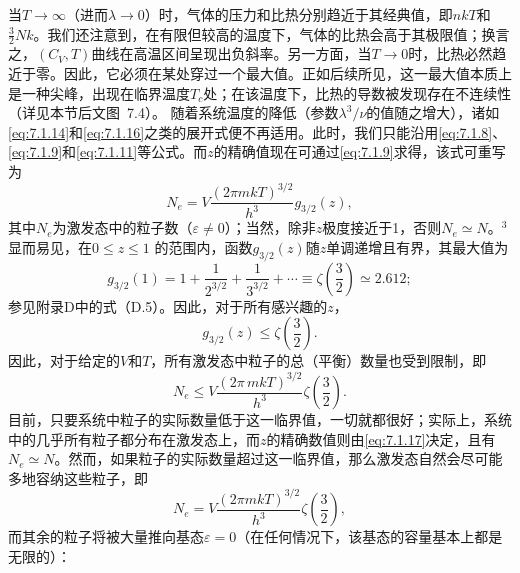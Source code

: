 当\(T \to \infty\)（进而\(\lambda \to 0\)）时，气体的压力和比热分别趋近于其经典值，即\(nkT\)和\(\frac{3}{2}Nk\)。我们还注意到，在有限但较高的温度下，气体的比热会高于其极限值；换言之，\((C_V, T)\)曲线在高温区间呈现出负斜率。另一方面，当\(T \to 0\)时，比热必然趋近于零。因此，它必须在某处穿过一个最大值。正如后续所见，这一最大值本质上是一种尖峰，出现在临界温度\(T_c\)处；在该温度下，比热的导数被发现存在不连续性（详见本节后文图~7.4）。
随着系统温度的降低（参数\(\lambda^{3}/\nu\)的值随之增大），诸如\autoref{eq:7.1.14}和\autoref{eq:7.1.16}之类的展开式便不再适用。此时，我们只能沿用\autoref{eq:7.1.8}、\autoref{eq:7.1.9}和\autoref{eq:7.1.11}等公式。而\(z\)的精确值现在可通过\autoref{eq:7.1.9}求得，该式可重写为
\begin{equation}\tag{7.1.17}\label{eq:7.1.17}
N _ { e } = V \frac { ( 2 \pi m k T ) ^{3 / 2} } { h ^{3} } g _ { 3 / 2 } ( z ) ,
\end{equation}
其中\(N_{e}\)为激发态中的粒子数（\(\varepsilon \neq 0\)）；当然，除非\(z\)极度接近于1，否则\(N_{e} \simeq N\)。\(^{3}\) 显而易见，在\(0 \leq z \leq 1\) 的范围内，函数\(g_{3/2}(z)\)随\(z\)单调递增且有界，其最大值为
\begin{equation}\tag{7.1.18}\label{eq:7.1.18}
g _ { 3 / 2 } ( 1 ) = 1 + \frac { 1 } { 2 ^{3 / 2} } + \frac { 1 } { 3 ^{3 / 2} } + \cdots \equiv \zeta \left( \frac { 3 } { 2 } \right) \simeq 2 . 61 2 ;
\end{equation}
参见附录D中的式（D.5）。因此，对于所有感兴趣的\(z\)，
\begin{equation}\tag{7.1.19}\label{eq:7.1.19}
g _ { 3 / 2 } ( z ) \leq \zeta \left( \frac { 3 } { 2 } \right) .
\end{equation}
因此，对于给定的\(V\)和\(T\)，所有激发态中粒子的总（平衡）数量也受到限制，即
\begin{equation}\tag{7.1.20}\label{eq:7.1.20}
N _ { e } \leq V \frac { ( 2 \pi \, m k T ) ^{3 / 2} } { h ^{3} } \zeta \left( \frac { 3 } { 2 } \right) .
\end{equation}
目前，只要系统中粒子的实际数量低于这一临界值，一切就都很好；实际上，系统中的几乎所有粒子都分布在激发态上，而\(z\)的精确数值则由\autoref{eq:7.1.17}决定，且有\(N_{e} \simeq N\)。然而，如果粒子的实际数量超过这一临界值，那么激发态自然会尽可能多地容纳这些粒子，即
\begin{equation}\tag{7.1.21}\label{eq:7.1.21}
N _ { e } = V \frac { ( 2 \pi m k T ) ^{3 / 2} } { h ^{3} } \zeta \left( \frac { 3 } { 2 } \right) ,
\end{equation}
而其余的粒子将被大量推向基态\(\varepsilon=0\)（在任何情况下，该基态的容量基本上都是无限的）：
